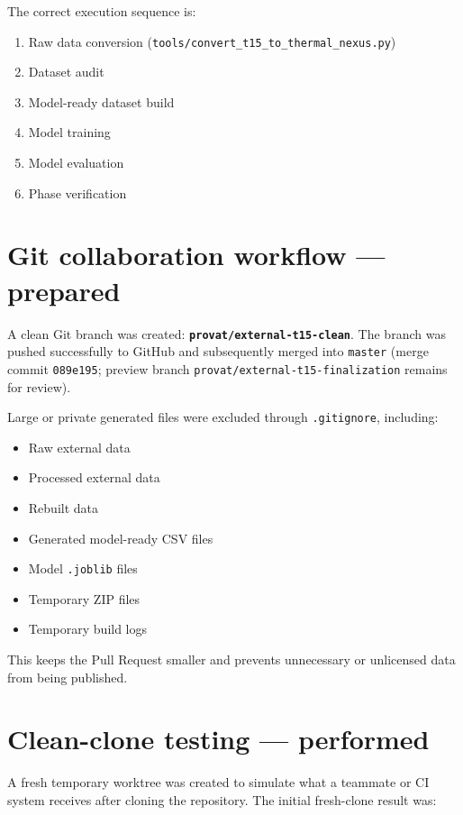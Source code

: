 \documentclass[11pt,a4paper]{article}
\begin{document}
\noindent The correct execution sequence is:
\begin{enumerate}[leftmargin=2em,itemsep=2pt]
  \item Raw data conversion (\texttt{tools/convert\_t15\_to\_thermal\_nexus.py})
  \item Dataset audit
  \item Model-ready dataset build
  \item Model training
  \item Model evaluation
  \item Phase verification
\end{enumerate}

\section{Git collaboration workflow --- prepared}

A clean Git branch was created: \textbf{\texttt{provat/external-t15-clean}}.
The branch was pushed successfully to GitHub and subsequently merged into
\texttt{master} (merge commit \texttt{089e195}; preview branch
\texttt{provat/external-t15-finalization} remains for review).

\noindent Large or private generated files were excluded through
\texttt{.gitignore}, including:
\begin{itemize}[leftmargin=2em,itemsep=2pt]
  \item Raw external data
  \item Processed external data
  \item Rebuilt data
  \item Generated model-ready CSV files
  \item Model \texttt{.joblib} files
  \item Temporary ZIP files
  \item Temporary build logs
\end{itemize}

\noindent This keeps the Pull Request smaller and prevents unnecessary or
unlicensed data from being published.

\section{Clean-clone testing --- performed}

A fresh temporary worktree was created to simulate what a teammate or
CI system receives after cloning the repository. The initial fresh-clone
result was:
\end{document}
